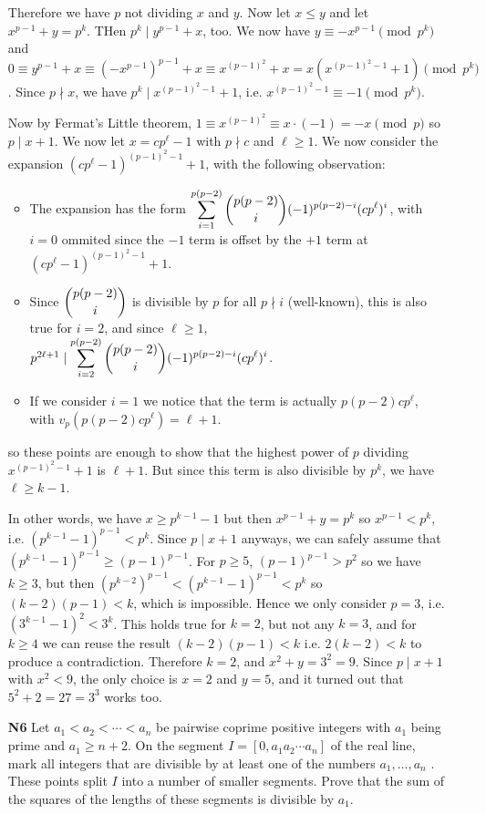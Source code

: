 \documentclass[11pt,a4paper]{article}
\begin{document}
\begin{enumerate}
	Therefore we have $p$ not dividing $x$ and $y$. Now let $x\le y$ and let $x^{p-1}+y=p^k$. THen $p^k\mid y^{p-1}+x$, too. We now have $y\equiv -x^{p-1}\pmod{p^k}$ and $0\equiv y^{p-1}+x\equiv (-x^{p-1})^{p-1}+x\equiv x^{(p-1)^2}+x=x(x^{(p-1)^2-1}+1)\pmod{p^k}$. 
	Since $p\nmid x$, we have $p^k\mid x^{(p-1)^2-1}+1$, i.e. $x^{(p-1)^2-1}\equiv -1\pmod{p^k}$. 
	
	Now by Fermat's Little theorem, $1\equiv x^{(p-1)^2}\equiv x\cdot(-1)=-x\pmod{p}$ so $p\mid x+1$. We now let $x=cp^{\ell}-1$ with $p\nmid c$ and $\ell\ge 1$. We now consider the expansion $(cp^{\ell}-1)^{(p-1)^2-1}+1$, with the following observation: 
	\begin{itemize}
		\item The expansion has the form $\dsum_{i=1}^{p(p-2)}\dbinom{p(p-2)}{i}(-1)^{p(p-2)-i}(cp^{\ell})^i$, with $i=0$ ommited since the $-1$ term is offset by the $+1$ term at $(cp^{\ell}-1)^{(p-1)^2-1}+1$. 
		
		\item Since $\dbinom{p(p-2)}{i}$ is divisible by $p$ for all $p\nmid i$ (well-known), this is also true for $i=2$, and since $\ell\ge 1$, $p^{2\ell+1}\mid \dsum_{i=2}^{p(p-2)}\dbinom{p(p-2)}{i}(-1)^{p(p-2)-i}(cp^{\ell})^i$. 
		
		\item If we consider $i=1$ we notice that the term is actually $p(p-2)cp^{\ell}$, with $v_p(p(p-2)cp^{\ell})=\ell+1$. 
	\end{itemize}
	so these points are enough to show that the highest power of $p$ dividing $x^{(p-1)^2-1}+1$ is $\ell+1$. But since this term is also divisible by $p^k$, we have $\ell\ge k-1$. 
	
	In other words, we have $x\ge p^{k-1}-1$ but then $x^{p-1}+y=p^k$ so $x^{p-1}<p^k$, i.e. $(p^{k-1}-1)^{p-1}<p^k$. Since $p\mid x+1$ anyways, we can safely assume that $(p^{k-1}-1)^{p-1}\ge (p-1)^{p-1}$. For $p\ge 5$, $(p-1)^{p-1}>p^2$ so we have $k\ge 3$, but then $(p^{k-2})^{p-1} < (p^{k-1}-1)^{p-1}<p^k$ so $(k-2)(p-1)<k$, which is impossible. Hence we only consider $p=3$, i.e. $(3^{k-1}-1)^2<3^k$. This holds true for $k=2$, but not any $k=3$, and for $k\ge 4$ we can reuse the result $(k-2)(p-1)<k$ i.e. $2(k-2)<k$ to produce a contradiction. 
	Therefore $k=2$, and $x^2+y=3^2=9$. Since $p\mid x+1$ with $x^2<9$, the only choice is $x=2$ and $y=5$, and it turned out that $5^2+2=27=3^3$ works too. 
	
	\item[\textbf{N6}] Let $a_1 < a_2 <  \cdots <a_n$ be pairwise coprime positive integers with $a_1$ being prime and $a_1 \ge n + 2$. On the segment $I = [0, a_1 a_2  \cdots a_n ]$ of the real line, mark all integers that are divisible by at least one of the numbers $a_1 ,   \ldots , a_n$ . These points split $I$ into a number of smaller segments. Prove that the sum of the squares of the lengths of these segments is divisible by $a_1$.
	

\end{enumerate}
\end{document}
